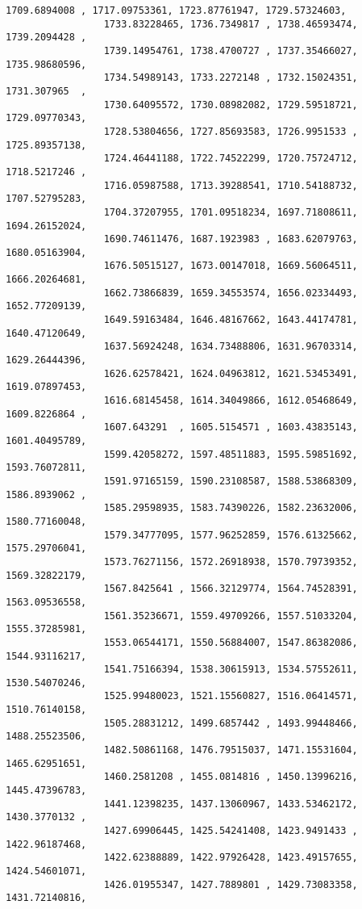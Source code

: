 \documentclass[11pt]{article}
\begin{document}
\begin{Verbatim}[commandchars=\\\{\}]
                 1709.6894008 , 1717.09753361, 1723.87761947, 1729.57324603,
                 1733.83228465, 1736.7349817 , 1738.46593474, 1739.2094428 ,
                 1739.14954761, 1738.4700727 , 1737.35466027, 1735.98680596,
                 1734.54989143, 1733.2272148 , 1732.15024351, 1731.307965  ,
                 1730.64095572, 1730.08982082, 1729.59518721, 1729.09770343,
                 1728.53804656, 1727.85693583, 1726.9951533 , 1725.89357138,
                 1724.46441188, 1722.74522299, 1720.75724712, 1718.5217246 ,
                 1716.05987588, 1713.39288541, 1710.54188732, 1707.52795283,
                 1704.37207955, 1701.09518234, 1697.71808611, 1694.26152024,
                 1690.74611476, 1687.1923983 , 1683.62079763, 1680.05163904,
                 1676.50515127, 1673.00147018, 1669.56064511, 1666.20264681,
                 1662.73866839, 1659.34553574, 1656.02334493, 1652.77209139,
                 1649.59163484, 1646.48167662, 1643.44174781, 1640.47120649,
                 1637.56924248, 1634.73488806, 1631.96703314, 1629.26444396,
                 1626.62578421, 1624.04963812, 1621.53453491, 1619.07897453,
                 1616.68145458, 1614.34049866, 1612.05468649, 1609.8226864 ,
                 1607.643291  , 1605.5154571 , 1603.43835143, 1601.40495789,
                 1599.42058272, 1597.48511883, 1595.59851692, 1593.76072811,
                 1591.97165159, 1590.23108587, 1588.53868309, 1586.8939062 ,
                 1585.29598935, 1583.74390226, 1582.23632006, 1580.77160048,
                 1579.34777095, 1577.96252859, 1576.61325662, 1575.29706041,
                 1573.76271156, 1572.26918938, 1570.79739352, 1569.32822179,
                 1567.8425641 , 1566.32129774, 1564.74528391, 1563.09536558,
                 1561.35236671, 1559.49709266, 1557.51033204, 1555.37285981,
                 1553.06544171, 1550.56884007, 1547.86382086, 1544.93116217,
                 1541.75166394, 1538.30615913, 1534.57552611, 1530.54070246,
                 1525.99480023, 1521.15560827, 1516.06414571, 1510.76140158,
                 1505.28831212, 1499.6857442 , 1493.99448466, 1488.25523506,
                 1482.50861168, 1476.79515037, 1471.15531604, 1465.62951651,
                 1460.2581208 , 1455.0814816 , 1450.13996216, 1445.47396783,
                 1441.12398235, 1437.13060967, 1433.53462172, 1430.3770132 ,
                 1427.69906445, 1425.54241408, 1423.9491433 , 1422.96187468,
                 1422.62388889, 1422.97926428, 1423.49157655, 1424.54601071,
                 1426.01955347, 1427.7889801 , 1429.73083358, 1431.72140816,

\end{Verbatim}
\end{document}
